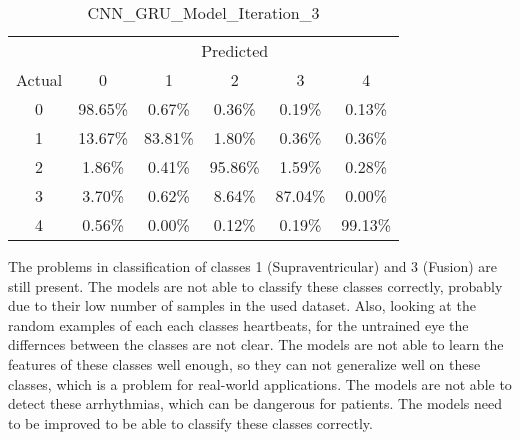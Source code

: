 \begin{table}[ht]
\begin{minipage}{0.32\textwidth}
        \caption*{CNN\_GRU\_Model\_Iteration\_3}
        \begin{tabular}{cccccc}
            \toprule
            & \multicolumn{5}{c}{Predicted} \\
            \cmidrule(lr){2-6}
            Actual & 0 & 1 & 2 & 3 & 4 \\
            \midrule
            0 & 98.65\% & 0.67\% & 0.36\% & 0.19\% & 0.13\% \\
            1 & 13.67\% & 83.81\% & 1.80\% & 0.36\% & 0.36\% \\
            2 & 1.86\%  & 0.41\% & 95.86\% & 1.59\% & 0.28\% \\
            3 & 3.70\%  & 0.62\% & 8.64\%  & 87.04\% & 0.00\% \\
            4 & 0.56\%  & 0.00\% & 0.12\%  & 0.19\% & 99.13\% \\
            \bottomrule
        \end{tabular}
    \end{minipage}
\end{table}

The problems in classification of classes 1 (Supraventricular) and 3 (Fusion) are still present. The models are not able to classify these classes correctly, probably due to their low number of samples in the used dataset. Also, looking at the random examples of each each classes heartbeats, for the untrained eye the differnces between the classes are not clear. 
The models are not able to learn the features of these classes well enough, so they can not generalize well on these classes, which is a problem for real-world applications. The models are not able to detect these arrhythmias, which can be dangerous for patients. The models need to be improved to be able to classify these classes correctly. 